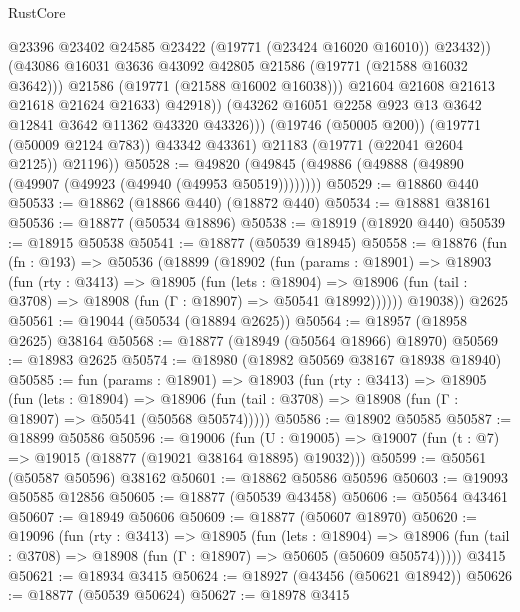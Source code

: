 \begin{lexlean}{RustCore}
\begin{coremodule}
                          @23396
                          @23402
                          @24585
                          @23422
                          (@19771 (@23424 @16020 @16010))
                          @23432))
                      (@43086 @16031 @3636 @43092 @42805 @21586 (@19771 (@21588 @16032 @3642)))
                      @21586
                      (@19771 (@21588 @16002 @16038)))
                    @21604
                    @21608
                    @21613
                    @21618
                    @21624
                    @21633)
                  @42918))
              (@43262 @16051 @2258 @923 @13 @3642 @12841 @3642 @11362 @43320 @43326)))
          (@19746 (@50005 @200))
          (@19771 (@50009 @2124 @783))
          @43342
          @43361)
        @21183
        (@19771 (@22041 @2604 @2125))
        @21196))
@50528 := @49820 (@49845 (@49886 (@49888 (@49890 (@49907 (@49923 (@49940 (@49953 @50519))))))))
@50529 := @18860 @440
@50533 := @18862 (@18866 @440) (@18872 @440)
@50534 := @18881 @38161
@50536 := @18877 (@50534 @18896)
@50538 := @18919 (@18920 @440)
@50539 := @18915 @50538
@50541 := @18877 (@50539 @18945)
@50558 := @18876
    (fun (fn : @193) =>
    @50536
      (@18899
        (@18902
          (fun (params : @18901) =>
          @18903
            (fun (rty : @3413) =>
            @18905
              (fun (lets : @18904) =>
              @18906 (fun (tail : @3708) => @18908 (fun (Γ : @18907) => @50541 @18992))))))
        @19038))
    @2625
@50561 := @19044 (@50534 (@18894 @2625))
@50564 := @18957 (@18958 @2625) @38164
@50568 := @18877 (@18949 (@50564 @18966) @18970)
@50569 := @18983 @2625
@50574 := @18980 (@18982 @50569 @38167 @18938 @18940)
@50585 := fun (params : @18901) =>
  @18903
    (fun (rty : @3413) =>
    @18905
      (fun (lets : @18904) =>
      @18906 (fun (tail : @3708) => @18908 (fun (Γ : @18907) => @50541 (@50568 @50574)))))
@50586 := @18902 @50585
@50587 := @18899 @50586
@50596 := @19006
    (fun (U : @19005) => @19007 (fun (t : @7) => @19015 (@18877 (@19021 @38164 @18895) @19032)))
@50599 := @50561 (@50587 @50596) @38162
@50601 := @18862 @50586 @50596
@50603 := @19093 @50585 @12856
@50605 := @18877 (@50539 @43458)
@50606 := @50564 @43461
@50607 := @18949 @50606
@50609 := @18877 (@50607 @18970)
@50620 := @19096
    (fun (rty : @3413) =>
    @18905
      (fun (lets : @18904) =>
      @18906 (fun (tail : @3708) => @18908 (fun (Γ : @18907) => @50605 (@50609 @50574)))))
    @3415
@50621 := @18934 @3415
@50624 := @18927 (@43456 (@50621 @18942))
@50626 := @18877 (@50539 @50624)
@50627 := @18978 @3415

\end{coremodule}
\end{lexlean}
